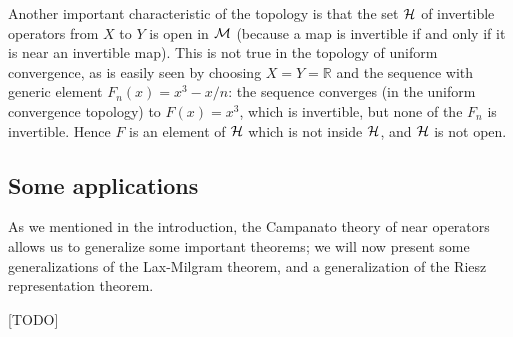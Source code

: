 \documentclass[12pt]{article}
\theoremstyle{normale}
\theoremstyle{liscio}
\begin{document}
Another important characteristic of the topology is that the set
$\mathcal{H}$ of invertible operators from $X$ to $Y$ is open in $\mathcal{M}$
(because a map is invertible if and only if it is near an invertible map).
This is not true in the topology of uniform convergence, as is
easily seen by choosing $X = Y = \mathbb{R}$ and the sequence with
generic element $F_n(x) = x^3 - x/n$: the sequence converges (in
the uniform convergence topology) to $F(x) = x^3$, which is
invertible, but none of the $F_n$ is invertible. Hence $F$ is an
element of $\mathcal{H}$ which is not inside $\mathcal{H}$, and $\mathcal{H}$ is not open.

\subsection{Some applications}

As we mentioned in the introduction, the Campanato theory of near
operators allows us to generalize some important theorems; we will
now present some generalizations of the Lax-Milgram theorem, and
a generalization of the Riesz representation theorem.

[TODO]
\end{document}
